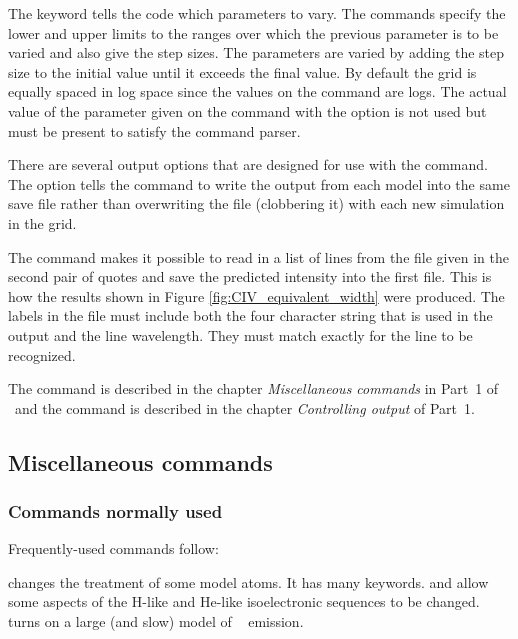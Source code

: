 \documentclass[12pt,twoside]{article}
\begin{document}
The  keyword tells the code
which parameters to vary.  The 
commands specify the lower and upper limits to the ranges over which the
previous parameter is to be varied and also give the step sizes.  The
parameters are varied by adding the step size to the initial value until
it exceeds the final value.  By default the grid is equally spaced in log space since
the values on the  command are
logs.  The actual value of the parameter
given on the command with the 
option is not used but must be present to satisfy the command parser.

There are several output options that are designed for use
with the  command.
The  option tells the 
command to write the output from each
model into the same save file rather than overwriting the file (clobbering
it) with each new simulation in the grid.

The  command makes
it possible to read in a list of lines
from the file given in the second pair of quotes and save the predicted
intensity into the first file.
This is how the results shown in Figure \ref{fig:CIV_equivalent_width}
were produced.
The labels in the file must include both the four character
string that is used in the output and the line wavelength.  They must match
exactly for the line to be recognized.

The  command is described
in the chapter \emph{Miscellaneous commands} in
Part~1 of \Hazy\ and the  command is described in the chapter
\emph{Controlling output} of Part~1.

\subsection{Miscellaneous commands}

\subsubsection{Commands normally used}

Frequently-used commands follow:

 changes the treatment of
some model atoms.  It has many keywords.
 and 
allow some aspects of the H-like and He-like
isoelectronic sequences to be changed.  
turns on a large (and slow) model of \htwo\ \citep{Shaw2005} emission.
\end{document}
